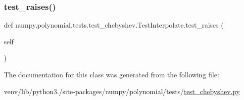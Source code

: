 \subsubsection{\texorpdfstring{test\+\_\+raises()}{test\_raises()}}
{\footnotesize\ttfamily def numpy.\+polynomial.\+tests.\+test\+\_\+chebyshev.\+Test\+Interpolate.\+test\+\_\+raises (\begin{DoxyParamCaption}\item[{}]{self }\end{DoxyParamCaption})}



The documentation for this class was generated from the following file\+:\begin{DoxyCompactItemize}
\item 
venv/lib/python3./site-\/packages/numpy/polynomial/tests/\hyperlink{test__chebyshev_8py}{test\+\_\+chebyshev.\+py}\end{DoxyCompactItemize}
